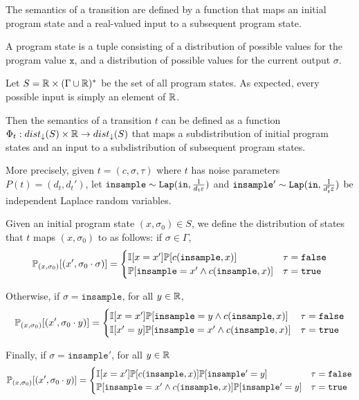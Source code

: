 The semantics of a transition are defined by a function that maps an initial program state and a real-valued input to a subsequent program state. 

A program state is a tuple consisting of a distribution of possible values for the program value $\texttt{x}$, and a distribution of possible values for the current output $\sigma$. 

Let $S = \mathbb{R}\times (\Gamma \cup \mathbb{R})^*$ be the set of all program states. 
As expected, every possible input is simply an element of $\mathbb{R}$.

Then the semantics of a transition $t$ can be defined as a function $\Phi_t:dist_\downarrow(S)\times \mathbb{R} \to dist_\downarrow (S)$ that maps a subdistribution of initial program states and an input to a subdistribution of subsequent program states. 

More precisely, given $t = (c, \sigma, \tau)$ where $t$ has noise parameters $P(t) = (d_t, d_t')$, let $\texttt{insample}\sim \texttt{Lap}(\texttt{in}, \frac{1}{d_t\varepsilon})$ and $\texttt{insample}'\sim \texttt{Lap}(\texttt{in}, \frac{1}{d_t'\varepsilon})$ be independent Laplace random variables. 

Given an initial program state $(x, \sigma_0)\in S$, we define the distribution of states that $t$ maps $(x, \sigma_0)$ to as follows: if $\sigma \in \Gamma$,
\[\mathbb{P}_{(x, \sigma_0)}[(x', \sigma_0\cdot \sigma)] = \begin{cases}
  \mathbb{I}[x = x']\mathbb{P}[c(\texttt{insample}, x)] & \tau = \texttt{false}\\
  \mathbb{P}[\texttt{insample} = x' \land c(\texttt{insample}, x)] & \tau = \texttt{true}
\end{cases}\]

Otherwise, if $\sigma=\texttt{insample}$, for all $y\in \mathbb{R}$,
\[\mathbb{P}_{(x, \sigma_0)}[(x', \sigma_0\cdot y)] = \begin{cases}
  \mathbb{I}[x = x']\mathbb{P}[\texttt{insample} = y\land c(\texttt{insample}, x)] & \tau = \texttt{false}\\
  \mathbb{I}[x'=y]\mathbb{P}[\texttt{insample} = x' \land c(\texttt{insample}, x)] & \tau = \texttt{true}
\end{cases}\]

Finally, if $\sigma=\texttt{insample}'$, for all $y\in \mathbb{R}$
\[\mathbb{P}_{(x, \sigma_0)}[(x', \sigma_0\cdot y)] = \begin{cases}
  \mathbb{I}[x = x']\mathbb{P}[c(\texttt{insample}, x)]\mathbb{P}[\texttt{insample}' = y] & \tau = \texttt{false}\\
  \mathbb{P}[\texttt{insample} = x' \land c(\texttt{insample}, x)]\mathbb{P}[\texttt{insample}' = y] & \tau = \texttt{true}
\end{cases}\]

